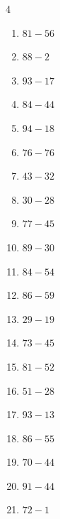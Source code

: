 \begin{multicols}{4}
\begin{enumerate}
  \item $81-56$
        \phantom{$=25$}

  \item $88-2$
        \phantom{$=86$}

  \item $93-17$
        \phantom{$=76$}

  \item $84-44$
        \phantom{$=40$}

  \item $94-18$
        \phantom{$=76$}

  \item $76-76$
        \phantom{$=0$}

  \item $43-32$
        \phantom{$=11$}

  \item $30-28$
        \phantom{$=2$}

  \item $77-45$
        \phantom{$=32$}

  \item $89-30$
        \phantom{$=59$}

  \item $84-54$
        \phantom{$=30$}

  \item $86-59$
        \phantom{$=27$}

  \item $29-19$
        \phantom{$=10$}

\columnbreak %

\resetques

  \item $73-45$
        \phantom{$=28$}

  \item $81-52$
        \phantom{$=29$}

  \item $51-28$
        \phantom{$=23$}

  \item $93-13$
        \phantom{$=80$}

  \item $86-55$
        \phantom{$=31$}

  \item $70-44$
        \phantom{$=26$}

  \item $91-44$
        \phantom{$=47$}

  \item $72-1$
        \phantom{$=71$}


\end{enumerate}
\end{multicols}
